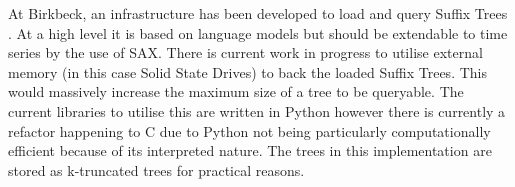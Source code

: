 \documentclass[../report.tex]{subfiles}
\begin{document}
	At Birkbeck, an infrastructure has been developed to load and query Suffix Trees \citep{bbk-suffix}.  At a high level it is based on language models but should be extendable to time series by the use of SAX.  There is current work in progress to utilise external memory (in this case Solid State Drives) to back the loaded Suffix Trees.  This would massively increase the maximum size of a tree to be queryable.  The current libraries to utilise this are written in Python however there is currently a refactor happening to C due to Python not being particularly computationally efficient because of its interpreted nature.  The trees in this implementation are stored as k-truncated trees for practical reasons.
	
\end{document}
